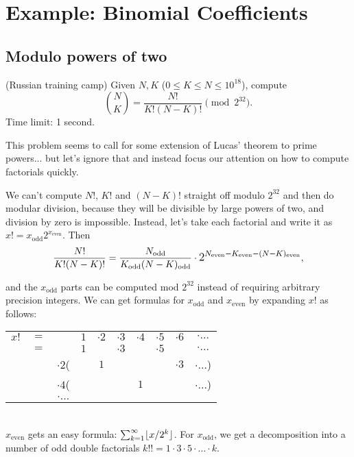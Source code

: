 \chapter{Example: Binomial Coefficients}
\section{Modulo powers of two}
\begin{framed}
\noindent
(Russian training camp) Given $N, K$ ($0 \le K \le N \le 10^{18}$), compute
\[
\binom N K = \frac{N!}{K!(N-K)!} \pmod {2^{32}}.
\]
Time limit: 1 second.
\end{framed}
This problem seems to call for some extension of Lucas' theorem to prime powers... but let's ignore that and instead focus our attention on how to compute factorials quickly.

\newcommand{\odd}[1]{#1_\text{odd}}
\newcommand{\even}[1]{#1_\text{even}}

We can't compute $N!$, $K!$ and $(N-K)!$ straight off modulo $2^{32}$ and then do modular division, because they will be divisible by large powers of two, and division by zero is impossible.
Instead, let's take each factorial and write it as $x! = \odd{x}2^{\even{x}}$. Then
\[
\frac{N!}{K!(N-K)!} =
\frac{\odd N}{\odd K \odd{(N-K)}} \cdot \mathlarger{2^{\even N - \even K - \even{(N-K)}}},
\]

and the $\odd x$ parts can be computed mod $2^{32}$ instead of requiring arbitrary precision integers.
We can get formulas for $\odd x$ and $\even x$ by expanding $x!$ as follows: \\
\begin{tabular}{cccccccccc}
$x!$&$=$&          &$1$& $\cdot 2$ &$\cdot 3$ &$\cdot 4$ &$\cdot 5$ & $\cdot 6$ & $\cdot \ldots$ \\
    &$=$&          &$1$&           &$\cdot 3$ &          &$\cdot 5$ &           & $\cdot \ldots$ \\
    &   &$\cdot 2$(&   & $1$       &          &          &          & $\cdot 3$ & $\cdot \ldots$)\\
    &   &$\cdot 4$(&   &           &          &  $1$     &          &           & $\cdot \ldots$)\\
    &   &$\cdot \ldots$ &
\end{tabular}
\\
$\even x$ gets an easy formula: $\sum_{k=1}^\infty \lfloor x / 2^k\rfloor$.
For $\odd x$, we get a decomposition into a number of odd double factorials $k!! = 1 \cdot 3 \cdot 5 \cdot \ldots \cdot k$.

